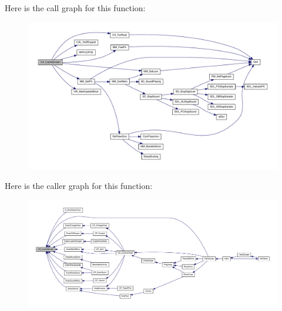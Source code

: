 Here is the call graph for this function:
\nopagebreak
\begin{figure}[H]
\begin{center}
\leavevmode
\includegraphics[width=400pt]{ID__CA_8H_a61ed1e53a23fd4c6ef784e6ec7ae73d2_cgraph}
\end{center}
\end{figure}




Here is the caller graph for this function:
\nopagebreak
\begin{figure}[H]
\begin{center}
\leavevmode
\includegraphics[width=400pt]{ID__CA_8H_a61ed1e53a23fd4c6ef784e6ec7ae73d2_icgraph}
\end{center}
\end{figure}


